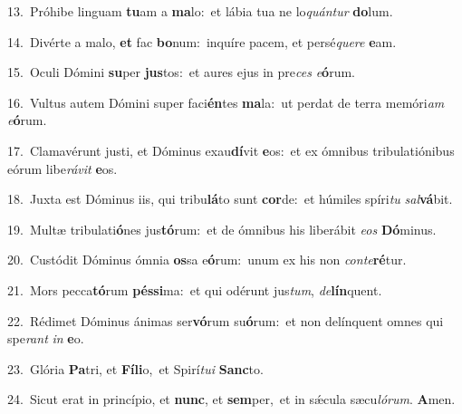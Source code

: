 {\numbfont\textcolor{\numbcolor}{13.}}~Próhibe linguam \textbf{tu}\-am a \textbf{ma}\-lo:~\star et lábia tua ne lo\-\textit{quán}\-\textit{tur} \textbf{do}\-lum.\par
{\numbfont\textcolor{\numbcolor}{14.}}~Divérte a malo, \textbf{et} fac \textbf{bo}\-num:~\star inquíre pacem, et persé\-\textit{que}\-\textit{re} \textbf{e}\-am.\par
{\numbfont\textcolor{\numbcolor}{15.}}~Oculi Dómini \textbf{su}\-per \textbf{jus}\-tos:~\star et aures ejus in pre\textit{ces} \textit{e}\-\textbf{ó}rum.\par
{\numbfont\textcolor{\numbcolor}{16.}}~Vultus autem Dómini super faci\-\textbf{én}\-tes \textbf{ma}\-la:~\star ut perdat de terra memóri\textit{am} \textit{e}\-\textbf{ó}rum.\par
{\numbfont\textcolor{\numbcolor}{17.}}~Clamavérunt justi, et Dóminus exau\-\textbf{dí}\-vit \textbf{e}\-os:~\star et ex ómnibus tribulatiónibus eórum libe\-\textit{rá}\-\textit{vit} \textbf{e}\-os.\par
{\numbfont\textcolor{\numbcolor}{18.}}~Juxta est Dóminus iis, qui tribu\-\textbf{lá}\-to sunt \textbf{cor}\-de:~\star et húmiles spíri\textit{tu} \textit{sal}\-\textbf{vá}bit.\par
{\numbfont\textcolor{\numbcolor}{19.}}~Multæ tribulati\-\textbf{ó}\-nes jus\-\textbf{tó}\-rum:~\star et de ómnibus his liberábit \textit{e}\-\textit{os} \textbf{Dó}\-minus.\par
{\numbfont\textcolor{\numbcolor}{20.}}~Custódit Dóminus ómnia \textbf{os}\-sa e\-\textbf{ó}\-rum:~\star unum ex his non \textit{con}\-\textit{te}\textbf{ré}tur.\par
{\numbfont\textcolor{\numbcolor}{21.}}~Mors pecca\-\textbf{tó}\-rum \textbf{pés}\-\textbf{si}ma:~\star et qui odérunt jus\-\textit{tum}\-, \textit{de}\-\textbf{lín}quent.\par
{\numbfont\textcolor{\numbcolor}{22.}}~Rédimet Dóminus ánimas ser\-\textbf{vó}\-rum su\-\textbf{ó}\-rum:~\star et non delínquent omnes qui spe\textit{rant} \textit{in} \textbf{e}\-o.\par
{\numbfont\textcolor{\numbcolor}{23.}}~Glória \textbf{Pa}\-tri, et \textbf{Fí}\-\textbf{li}o,~\star et Spirí\-\textit{tu}\-\textit{i} \textbf{Sanc}\-to.\par
{\numbfont\textcolor{\numbcolor}{24.}}~Sicut erat in princípio, et \textbf{nunc}\-, et \textbf{sem}\-per,~\star et in sǽcula sæcu\-\textit{ló}\-\textit{rum}. \textbf{A}\-men.\par
